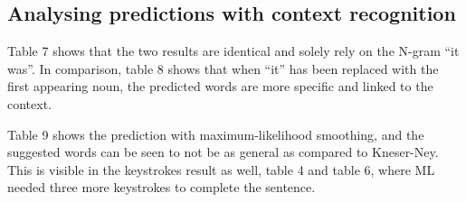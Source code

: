 \subsection{Analysing predictions with context recognition}
Table 7 shows that the two results are identical and solely rely on the N-gram “it was”. In comparison, table 8 shows that when “it” has been replaced with the first appearing noun, the predicted words are more specific and linked to the context.

Table 9 shows the prediction with maximum-likelihood smoothing, and the suggested words can be seen to not be as general as compared to Kneser-Ney. This is visible in the keystrokes result as well, table 4 and table 6, where ML needed three more keystrokes to complete the sentence.